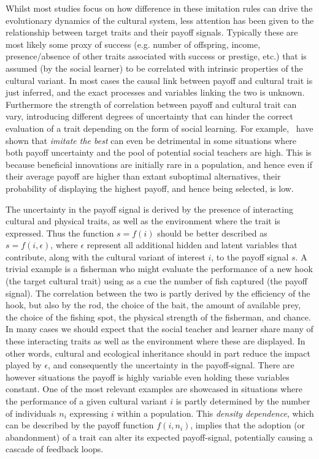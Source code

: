 \documentclass[review,authoryear]{elsarticle}
\begin{document}
Whilst most studies focus on how difference in these imitation rules can drive the evolutionary dynamics of the cultural system, less attention has been given to the relationship between target traits and their payoff signals. Typically these are most likely some proxy of success (e.g. number of offspring, income, presence/absence of other traits associated with success or prestige, etc.)  that is assumed (by the social learner) to be correlated with intrinsic properties of the cultural variant. In most cases the causal link between  payoff and cultural trait is just inferred, and the exact processes and variables linking the two is unknown. Furthermore the strength of correlation between payoff and cultural trait can vary, introducing different degrees of uncertainty that can hinder the correct evaluation of a trait depending on the form of social learning. For example,~\citet{crema_lake_inpress} have shown that \emph{imitate the best} can even be detrimental in some situations where both payoff uncertainty  and the pool of potential social teachers are high.  This is because beneficial innovations are initially rare in a population, and hence even if their average payoff are higher than extant suboptimal alternatives, their probability of displaying the highest payoff, and hence being selected, is low.

The uncertainty in the payoff signal is derived by the presence of interacting cultural and physical traits, as well as the environment where the trait is expressed. Thus the function $s=f(i)$ should be better described as $s=f(i,\epsilon)$, where $\epsilon$ represent all additional hidden and latent variables that contribute, along with the cultural variant of interest $i$, to the payoff signal $s$. A trivial example is a fisherman who might evaluate the performance of a new hook (the target cultural trait) using as a cue the number of fish captured (the payoff signal). The correlation between the two is partly derived by the efficiency of the hook, but also by the rod, the choice of the bait, the amount of available prey, the choice of the fishing spot, the physical strength of the fisherman, and chance. In many cases we should expect that the social teacher and learner share many of these interacting traits as well as the environment where these are displayed. In other words, cultural and ecological inheritance should in part reduce the impact played by $\epsilon$, and consequently the uncertainty in the payoff-signal. There are however situations the payoff is highly variable even holding these variables constant. One of the most relevant examples are showcased in situations where the performance of a given  cultural variant $i$ is partly determined by the number of individuals $n_i$ expressing $i$ within a population. This \emph{density dependence}, which can be described by the payoff function $f(i,n_i)$, implies that the adoption (or abandonment) of a trait can alter its expected payoff-signal, potentially causing a cascade of feedback loops.  
\end{document}
